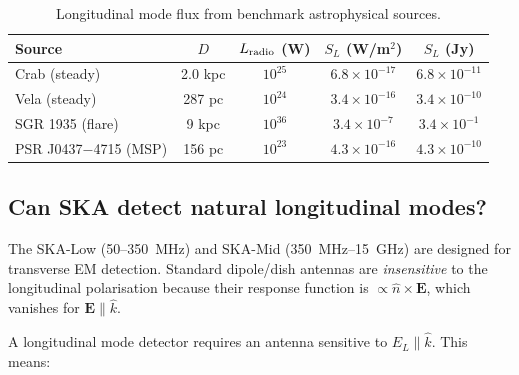 \documentclass[11pt]{article}
\newcommand{\ee}[1]{\times 10^{#1}}
\newcommand{\Evec}{\mathbf{E}}
\begin{document}
\begin{table}[H]
\centering
\caption{Longitudinal mode flux from benchmark astrophysical sources.}
\begin{tabular}{lcccc}
\toprule
Source & $D$ & $L_{\rm radio}$ (W) & $S_L$ (W/m$^2$) & $S_L$ (Jy) \\
\midrule
Crab (steady) & 2.0 kpc & $10^{25}$ & $6.8\ee{-17}$ & $6.8\ee{-11}$ \\
Vela (steady) & 287 pc & $10^{24}$ & $3.4\ee{-16}$ & $3.4\ee{-10}$ \\
SGR 1935 (flare) & 9 kpc & $10^{36}$ & $3.4\ee{-7}$ & $3.4\ee{-1}$ \\
PSR J0437$-$4715 (MSP) & 156 pc & $10^{23}$ & $4.3\ee{-16}$ & $4.3\ee{-10}$ \\
\bottomrule
\end{tabular}
\label{tab:L-flux}
\end{table}

\subsection{Can SKA detect natural longitudinal modes?}

The SKA-Low (50--350~MHz) and SKA-Mid (350~MHz--15~GHz) are designed
for transverse EM detection. Standard dipole/dish antennas are
\textit{insensitive} to the longitudinal polarisation because their
response function is $\propto \hat{n} \times \Evec$, which vanishes
for $\Evec \parallel \hat{k}$.

A longitudinal mode detector requires an antenna sensitive to
$E_L \parallel \hat{k}$. This means:
\end{document}
